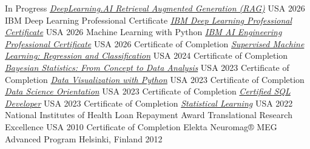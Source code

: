 {}



\begin{cvhonors}

  \cvhonor
    {In Progress} %
    {\href{https://www.coursera.org/learn/retrieval-augmented-generation}{\emph{DeepLearning.AI Retrieval Augmented Generation (RAG)}}} %
    {USA} %
    {2026}
  \cvhonor
    {IBM Deep Learning Professional Certificate} %
    {\href{https://www.coursera.org/account/accomplishments/verify/OUJCQZSHU8NV}{\emph{ΙΒΜ Deep Learning Professional Certificate}}} %
    {USA} %
    {2026}
  \cvhonor
    {Machine Learning with Python} %
    {\href{https://coursera.org/share/ac41f26ddb1d0c95e7f915a9d170fa47}{\emph{IBM AI Engineering Professional Certificate}}} %
    {USA} %
    {2026}
  \cvhonor
    {Certificate of Completion} %
    {\href{https://coursera.org/verify/UWLZ48LYBDFW}{\emph{Supervised Machine Learning: Regression and Classification}}} %
    {USA} %
    {2024} %
  \cvhonor
    {Certificate of Completion} %
    {\href{https://www.coursera.org/account/accomplishments/certificate/DR5CTTN4HL35}{\emph{Bayesian Statistics: From Concept to Data Analysis}}} %
    {USA}
    {2023}
  \cvhonor
    {Certificate of Completion} %
    {\href{https://www.coursera.org/account/accomplishments/certificate/G4G3368QTG2N}{\emph{Data Visualization with Python}}} %
    {USA} %
    {2023} %
  \cvhonor
    {Certificate of Completion} %
    {\href{https://www.coursera.org/account/accomplishments/certificate/HM6YZKUP8J8X}{\emph{Data Science Orientation}}} %
    {USA} %
    {2023} %
  \cvhonor
    {Certificate of Completion} %
    {\href{https://verify.w3schools.com/1NDRG69DTP}{\emph{Certified SQL Developer}}} %
    {USA} %
    {2023} %
  \cvhonor
    {Certificate of Completion} %
    {\href{https://courses.edx.org/certificates/6def26e9529b4ded83ebfe2e86e7e0da}{\emph{Statistical Learning}}} %
    {USA} %
    {2022} %
  \cvhonor
    {National Institutes of Health Loan Repayment Award} %
    {Translational Research Excellence} %
    {USA} %
    {2010} %
  \cvhonor
    {Certificate of Completion} %
    {Elekta Neuromag® MEG Advanced Program} %
    {Helsinki, Finland} %
    {2012} %
\end{cvhonors}
